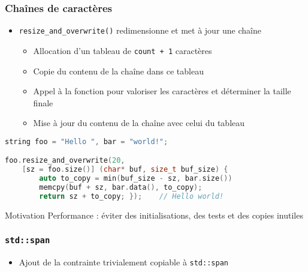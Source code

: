 \documentclass[C++.tex]{subfiles}
\begin{document}
\begin{frame}[fragile]
	\frametitle{Chaînes de caractères}
	\begin{itemize}
		\item \lstinline|resize_and_overwrite()| redimensionne et met à jour une chaîne
		\begin{itemize}
			\item Allocation d'un tableau de \lstinline|count + 1| caractères
			\item Copie du contenu de la chaîne dans ce tableau


			\item Appel à la fonction pour valoriser les caractères et déterminer la taille finale
			\item Mise à jour du contenu de la chaîne avec celui du tableau
		\end{itemize}
	\end{itemize}

	\begin{lstlisting}[language=C++]
string foo = "Hello ", bar = "world!";

foo.resize_and_overwrite(20, 
	[sz = foo.size()] (char* buf, size_t buf_size) {
		auto to_copy = min(buf_size - sz, bar.size())
		memcpy(buf + sz, bar.data(), to_copy);
		return sz + to_copy; });	// Hello world!\end{lstlisting}

	\begin{block}{Motivation}
		Performance : éviter des initialisations, des tests et des copies inutiles
	\end{block}
\end{frame}

\begin{frame}[fragile]
	\frametitle{\lstinline|std::span|}
	\begin{itemize}
		\item Ajout de la contrainte \og{}trivialement copiable\fg{} à \lstinline|std::span|
	\end{itemize}
\end{frame}
\end{document}
